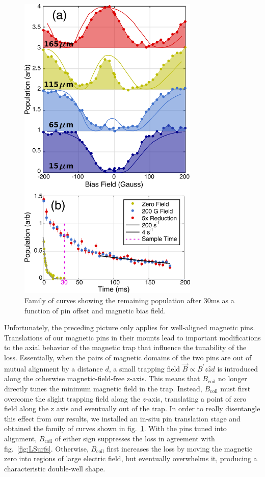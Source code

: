 \documentclass[%
 reprint,
 amsmath,amssymb,
 aps,
prl,
]{revtex4-1}
\begin{document}
\begin{figure}
\includegraphics[width=86mm]{VWFig/tim-style-by-dave.png}%
\caption{
Family of curves showing the remaining population after $30 \text{ms}$ as a function of pin offset and magnetic bias field.
\label{fig:WVplot}}
\end{figure}

Unfortunately, the preceding picture only applies for well-aligned magnetic pins. Translations of our magnetic pins in their mounts lead to important modifications to the axial behavior of the magnetic trap that influence the tunability of the loss. Essentially, when the pairs of magnetic domains of the two pins are out of mutual alignment by a distance $d$, a small trapping field $\vec{B}\propto B^\prime z\hat{z} d$ is introduced along the otherwise magnetic-field-free z-axis. This means that $B_\text{coil}$ no longer directly tunes the minimum magnetic field in the trap. Instead, $B_\text{coil}$ must first overcome the slight trapping field along the $z$-axis, translating a point of zero field along the z axis and eventually out of the trap. In order to really disentangle this effect from our results, we installed an in-situ pin translation stage and obtained the family of curves shown in fig.~\ref{fig:WVplot}. With the pins tuned into alignment, $B_\text{coil}$ of either sign suppresses the loss in agreement with fig.~\ref{fig:LSurfs}. Otherwise, $B_\text{coil}$ first increases the loss by moving the magnetic zero into regions of large electric field, but eventually overwhelms it, producing a characteristic double-well shape. 
\end{document}
